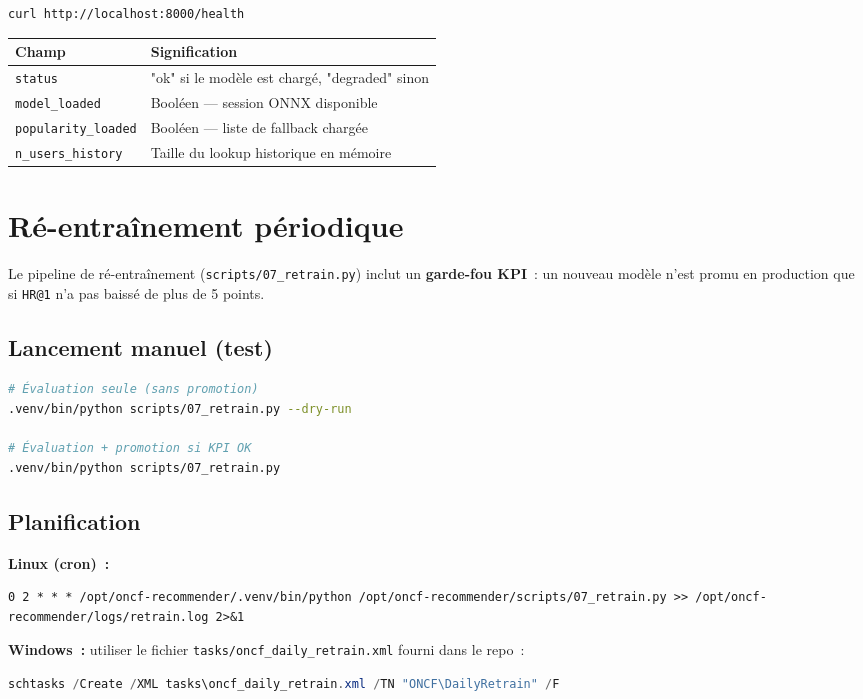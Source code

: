 \documentclass[11pt, a4paper]{article}
\begin{document}
\begin{lstlisting}[language=bash]
curl http://localhost:8000/health
\end{lstlisting}

\begin{tabularx}{\linewidth}{@{}lX@{}}
\toprule
\textbf{Champ} & \textbf{Signification} \\
\midrule
\texttt{status} & "ok" si le modèle est chargé, "degraded" sinon \\
\texttt{model\_loaded} & Booléen --- session ONNX disponible \\
\texttt{popularity\_loaded} & Booléen --- liste de fallback chargée \\
\texttt{n\_users\_history} & Taille du lookup historique en mémoire \\
\bottomrule
\end{tabularx}

\section{Ré-entraînement périodique}

Le pipeline de ré-entraînement (\texttt{scripts/07\_retrain.py}) inclut un
\textbf{garde-fou KPI}~: un nouveau modèle n'est promu en production que
si \texttt{HR@1} n'a pas baissé de plus de 5 points.

\subsection{Lancement manuel (test)}

\begin{lstlisting}[language=bash]
# Évaluation seule (sans promotion)
.venv/bin/python scripts/07_retrain.py --dry-run

# Évaluation + promotion si KPI OK
.venv/bin/python scripts/07_retrain.py
\end{lstlisting}

\subsection{Planification}

\textbf{Linux (cron)~:}
\begin{lstlisting}
0 2 * * * /opt/oncf-recommender/.venv/bin/python /opt/oncf-recommender/scripts/07_retrain.py >> /opt/oncf-recommender/logs/retrain.log 2>&1
\end{lstlisting}

\textbf{Windows~:} utiliser le fichier \texttt{tasks/oncf\_daily\_retrain.xml}
fourni dans le repo~:
\begin{lstlisting}[language=powershell]
schtasks /Create /XML tasks\oncf_daily_retrain.xml /TN "ONCF\DailyRetrain" /F
\end{lstlisting}
\end{document}
